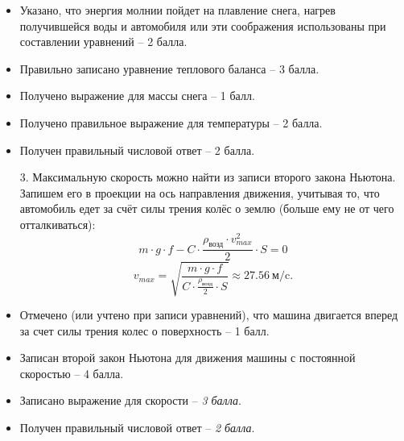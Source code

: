     \additionalCriteria
    \begin{itemize}
        \item Указано, что энергия молнии пойдет на плавление снега, нагрев получившейся воды и автомобиля 
        или эти соображения использованы при составлении уравнений – 2 балла.
        \item Правильно записано уравнение теплового баланса – 3 балла.
        \item Получено выражение для массы снега – 1 балл.
        \item Получено правильное выражение для температуры  – 2 балла.
        \item Получен правильный числовой ответ – 2 балла.      
    \end{itemize}

\begin{enumerate}
    \item[3.] Максимальную скорость можно найти из записи второго закона Ньютона. Запишем его в 
    проекции на ось направления движения, учитывая то, что автомобиль едет за счёт силы трения колёс 
    о землю (больше ему не от чего отталкиваться):
    $$m \cdot g \cdot f-C \cdot \frac{\rho_\text{возд} \cdot v^2_{max}}{2} \cdot S=0$$
    $$v_{max}=\sqrt{\frac{m \cdot g \cdot f}{C \cdot \frac{\rho_\text{возд}}{2} \cdot S}} \approx 27.56 \: \text{м/c}.$$

\end{enumerate}

\additionalCriteria
    \begin{itemize}
        \item Отмечено (или учтено при записи уравнений), что машина двигается вперед за счет силы трения колес о поверхность – 1 балл.
        \item Записан второй закон Ньютона для движения машины с постоянной скоростью – 4 балла.
        \item Записано выражение для скорости  –  \textit{3 балла}.
        \item Получен правильный числовой ответ – \textit{2 балла}.             
    \end{itemize}

